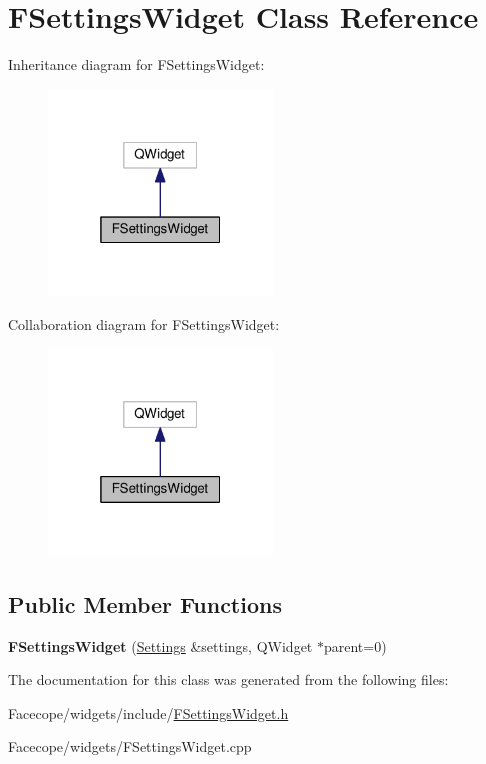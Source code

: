 \hypertarget{classFSettingsWidget}{}\section{F\+Settings\+Widget Class Reference}
\label{classFSettingsWidget}


Inheritance diagram for F\+Settings\+Widget\+:
\nopagebreak
\begin{figure}[H]
\begin{center}
\leavevmode
\includegraphics[width=169pt]{classFSettingsWidget__inherit__graph}
\end{center}
\end{figure}


Collaboration diagram for F\+Settings\+Widget\+:
\nopagebreak
\begin{figure}[H]
\begin{center}
\leavevmode
\includegraphics[width=169pt]{classFSettingsWidget__coll__graph}
\end{center}
\end{figure}
\subsection*{Public Member Functions}
\begin{DoxyCompactItemize}
\item 
\mbox{\label{classFSettingsWidget_ae1b1d529212ec2bb4f05a941d86dc9a6}} 
{\bfseries F\+Settings\+Widget} (\hyperlink{classSettings}{Settings} \&settings, Q\+Widget $\ast$parent=0)
\end{DoxyCompactItemize}


The documentation for this class was generated from the following files\+:\begin{DoxyCompactItemize}
\item 
Facecope/widgets/include/\hyperlink{FSettingsWidget_8h}{F\+Settings\+Widget.\+h}\item 
Facecope/widgets/F\+Settings\+Widget.\+cpp\end{DoxyCompactItemize}
